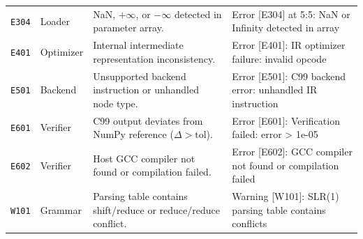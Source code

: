 \documentclass[11pt,a4paper]{article}
\begin{document}
\begin{center}
{\begin{tabular}{ll >{\raggedright\arraybackslash}p{6.8cm} >{\raggedright\arraybackslash\ttfamily\scriptsize}p{6.0cm}}
\texttt{E304} & Loader   & NaN, $+\infty$, or $-\infty$ detected in parameter array. & Error [E304] at 5:5: NaN or Infinity detected in array \\
\texttt{E401} & Optimizer& Internal intermediate representation inconsistency. & Error [E401]: IR optimizer failure: invalid opcode \\
\texttt{E501} & Backend  & Unsupported backend instruction or unhandled node type. & Error [E501]: C99 backend error: unhandled IR instruction \\
\texttt{E601} & Verifier & C99 output deviates from NumPy reference ($\Delta > \text{tol}$). & Error [E601]: Verification failed: error > 1e-05 \\
\texttt{E602} & Verifier & Host GCC compiler not found or compilation failed. & Error [E602]: GCC compiler not found or compilation failed \\
\texttt{W101} & Grammar  & Parsing table contains shift/reduce or reduce/reduce conflict. & Warning [W101]: SLR(1) parsing table contains conflicts \\
\bottomrule
\end{tabular}%
}
\end{center}
\end{document}
